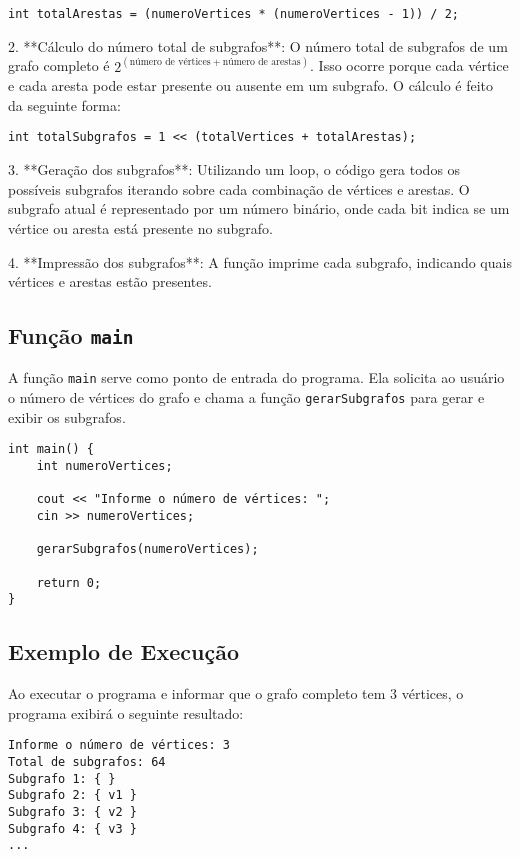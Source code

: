 \documentclass{article}
\begin{document}
\begin{lstlisting}
int totalArestas = (numeroVertices * (numeroVertices - 1)) / 2;
\end{lstlisting}

2. **Cálculo do número total de subgrafos**: O número total de subgrafos de um grafo completo é \( 2^{(\text{número de vértices} + \text{número de arestas})} \). Isso ocorre porque cada vértice e cada aresta pode estar presente ou ausente em um subgrafo. O cálculo é feito da seguinte forma:

\begin{lstlisting}
int totalSubgrafos = 1 << (totalVertices + totalArestas);
\end{lstlisting}

3. **Geração dos subgrafos**: Utilizando um loop, o código gera todos os possíveis subgrafos iterando sobre cada combinação de vértices e arestas. O subgrafo atual é representado por um número binário, onde cada bit indica se um vértice ou aresta está presente no subgrafo.

4. **Impressão dos subgrafos**: A função imprime cada subgrafo, indicando quais vértices e arestas estão presentes.

\subsection{Função \texttt{main}}

A função \texttt{main} serve como ponto de entrada do programa. Ela solicita ao usuário o número de vértices do grafo e chama a função \texttt{gerarSubgrafos} para gerar e exibir os subgrafos.

\begin{lstlisting}
int main() {
    int numeroVertices;
    
    cout << "Informe o número de vértices: ";
    cin >> numeroVertices;

    gerarSubgrafos(numeroVertices);

    return 0;
}
\end{lstlisting}

\subsection{Exemplo de Execução}

Ao executar o programa e informar que o grafo completo tem 3 vértices, o programa exibirá o seguinte resultado:

\begin{verbatim}
Informe o número de vértices: 3
Total de subgrafos: 64
Subgrafo 1: { }
Subgrafo 2: { v1 }
Subgrafo 3: { v2 }
Subgrafo 4: { v3 }
...
\end{verbatim}
\end{document}
